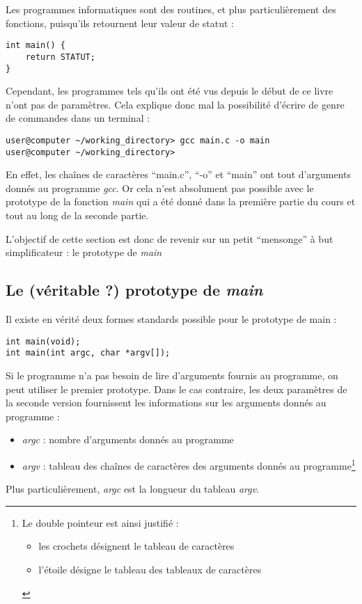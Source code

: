 \documentclass[../../../main.tex]{subfiles}
\begin{document}
Les programmes informatiques sont des routines, et plus particulièrement des fonctions, puisqu'ils retournent leur valeur de statut :
\begin{verbatim}
int main() {
	return STATUT;
}
\end{verbatim}
Cependant, les programmes tels qu'ils ont été vus depuis le début de ce livre n'ont pas de paramètres. Cela explique donc mal la possibilité d'écrire de genre de commandes dans un terminal :
\begin{verbatim}
user@computer ~/working_directory> gcc main.c -o main
user@computer ~/working_directory>
\end{verbatim}
En effet, les chaînes de caractères ``main.c'', ``-o'' et ``main'' ont tout d'arguments donnés au programme \textit{gcc}. Or cela n'est absolument pas possible avec le prototype de la fonction \textit{main} qui a été donné dans la première partie du cours et tout au long de la seconde partie.

L'objectif de cette section est donc de revenir sur un petit ``mensonge'' à but simplificateur : le prototype de \textit{main}
\subsection{Le (véritable ?) prototype de \textit{main}}
Il existe en vérité deux formes standards possible pour le prototype de \textsf{main} :
\begin{verbatim}
int main(void);
int main(int argc, char *argv[]);
\end{verbatim}
Si le programme n'a pas besoin de lire d'arguments fournis au programme, on peut utiliser le premier prototype. Dans le cas contraire, les deux paramètres de la seconde version fournissent les informations sur les arguments donnés au programme :
\begin{itemize}
	\item \textit{argc} : nombre d'arguments donnés au programme
	\item \textit{argv} : tableau des chaînes de caractères des arguments donnés au programme\footnote{Le double pointeur est ainsi justifié : \begin{itemize}
	\item les crochets désignent le tableau de caractères
	\item l'étoile désigne le tableau des tableaux de caractères
	\end{itemize}}
\end{itemize}
Plus particulièrement, \textit{argc} est la longueur du tableau \textit{argv}.
\end{document}
